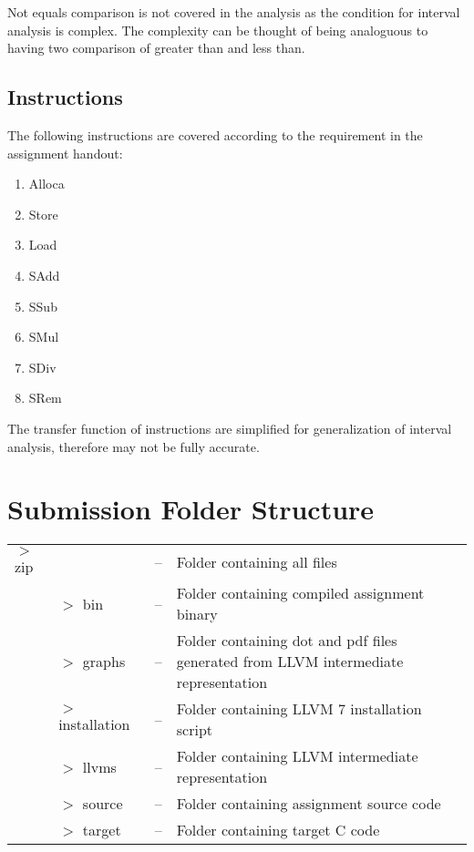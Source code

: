 \documentclass[11pt,a4paper,fleqn]{article}
\begin{document}
Not equals comparison is not covered in the analysis as the condition for interval analysis is complex.
The complexity can be thought of being analoguous to having two comparison of greater than and less than.

\subsection{Instructions}

The following instructions are covered according to the requirement in the assignment handout:

\begin{enumerate}
   \item Alloca
   \item Store
   \item Load
   \item SAdd
   \item SSub
   \item SMul
   \item SDiv
   \item SRem
\end{enumerate}

The transfer function of instructions are simplified for generalization of interval analysis, therefore may not be fully accurate.

\section{Submission Folder Structure}

\begin{tabularx}{\linewidth}{l l l X}
   $>$ zip &                  & -- & Folder containing all files                                                         \\
           & $>$ bin          & -- & Folder containing compiled assignment binary                                        \\
           & $>$ graphs       & -- & Folder containing dot and pdf files generated from LLVM intermediate representation \\
           & $>$ installation & -- & Folder containing LLVM 7 installation script                                        \\
           & $>$ llvms        & -- & Folder containing LLVM intermediate representation                                  \\
           & $>$ source       & -- & Folder containing assignment source code                                            \\
           & $>$ target       & -- & Folder containing target C code                                                     \\
\end{tabularx}
\end{document}
